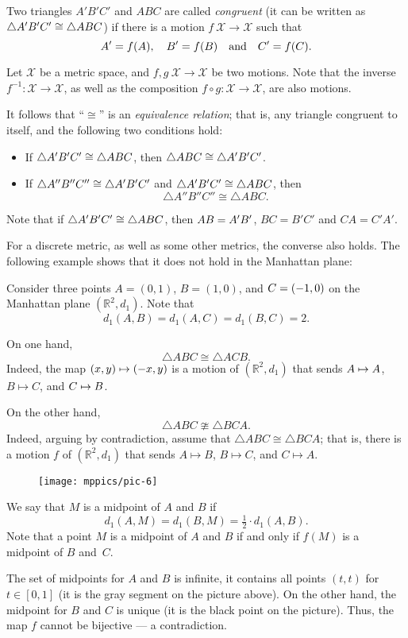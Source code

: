 Two triangles $A' B' C'$ and $A B C$ are called 
\emph{congruent}
(it can be written as $\triangle A' B' C'\z\cong\triangle A B C$) if there is a motion $f\:\mathcal{X}\to\mathcal{X}$ such that 
\[A'\z=f(A),
\quad
B'=f(B)
\quad
\text{and}
\quad
C'=f(C).\]

Let $\mathcal X$ be a metric space,
and $f,g\:\mathcal X\to\mathcal X$ be two motions.
Note that the inverse $f^{-1}:\mathcal X\to\mathcal X$,
as well as the composition $f\circ g:\mathcal X\to\mathcal X$,
are also motions.

It follows that ``$\cong$'' is an \emph{equivalence relation};
that is, any triangle congruent to itself, 
and the following two conditions hold:
\begin{itemize} 
\item If $\triangle A' B' C'\z\cong\triangle A B C$, then $\triangle A B C\z\cong\triangle A' B' C'$.
\item If $\triangle A'' B'' C''\z\cong\triangle A' B' C'$ and $\triangle A' B' C'\z\cong\triangle A B C$,
then 
$$\triangle A'' B'' C''\cong\triangle A B C.$$
\end{itemize}


Note that if $\triangle A' B' C'\z\cong\triangle A B C$,
then $AB\z=A'B'$,
$BC=B'C'$ and $CA=C'A'$.

For a discrete metric, as well as some other metrics, 
the converse also holds.
The following example shows that it does not hold in the Manhattan plane:

\label{example:isometric but not congruent} Consider three points 
$A=(0,1)$, $B=(1,0)$, and $C\z=(-1,0)$ on the Manhattan plane $(\mathbb{R}^2,d_1)$.
Note that
$$d_1(A,B)=d_1(A,C)=d_1(B,C)=2.$$

On one hand,
$$\triangle ABC\cong \triangle ACB.$$
Indeed, the map $(x,y)\z\mapsto (-x,y)$ is a motion of $(\mathbb{R}^2,d_1)$
that sends $A\z\mapsto A$, $B\mapsto C$, and $C\z\mapsto B$.

On the other hand,
$$\triangle ABC\ncong \triangle BCA.$$
Indeed, arguing by contradiction, assume that $\triangle ABC\cong \triangle BCA$; that is, there is a motion $f$ of $(\mathbb{R}^2,d_1)$ that sends $A\mapsto B$, $B\mapsto C$, and $C\mapsto A$.

\begin{wrapfigure}[6]{o}{33mm}
\vskip-4mm
\centering
\texttt{[image: mppics/pic-6]}
\end{wrapfigure}

We say that $M$ is a midpoint of $A$ and $B$ if 
\[d_1(A,M)=d_1(B,M)=\tfrac12\cdot d_1(A,B).\]
Note that a point $M$ is a midpoint of $A$ and $B$ if and only if $f(M)$ is a midpoint of $B$ and~$C$.

The set of midpoints for $A$ and $B$ is infinite, it contains all points $(t,t)$ for $t\in[0,1]$ (it is the gray segment on the picture above).
On the other hand, the midpoint for $B$ and $C$ is unique (it is the black point on the picture).
Thus, the map $f$ cannot be bijective --- a contradiction.

